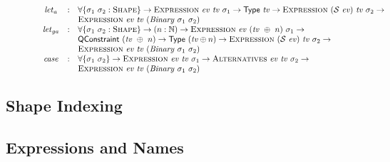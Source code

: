 \documentclass[a4paper]{jfp}
\begin{document}
\begin{figure}
\begin{displaymath}
\begin{array}{l}
\begin{array}{cll}
         \mathit{let}_a & : & \forall \{ \sigma_1\ \sigma_2 : \textsc{Shape} \} \rightarrow \textsc{Expression}\ \mathit{ev}\ \mathit{tv}\ \sigma_1
   \rightarrow \textsf{Type}\ \mathit{tv} \rightarrow \textsc{Expression}\ (\mathcal{S}\ \mathit{ev})\ \mathit{tv}\ \sigma_2 \rightarrow \\ &&\textsc{Expression}\ \mathit{ev}\ \mathit{tv}\
(\mathit{Binary}\ \sigma_1\ \sigma_2) \\
         \mathit{let}_{ga} & : & \forall \{ \sigma_1\ \sigma_2 : \textsc{Shape} \} \rightarrow (n : \mathbb{N}) \rightarrow \textsc{Expression}\
   \mathit{ev}\ (\mathit{tv}\ \oplus\ n)\ \sigma_1 \rightarrow \\ & & \textsf{QConstraint}\ (\mathit{tv}\ \oplus\ n)
   \rightarrow \textsf{Type}\ (\mathit{tv} \oplus n) \rightarrow \textsc{Expression}\ (\mathcal{S}\ \mathit{ev})\ \mathit{tv}\ \sigma_2 \rightarrow \\ &&\textsc{Expression}\ \mathit{ev}\ \mathit{tv}\
(\mathit{Binary}\ \sigma_1\ \sigma_2) \\
         \mathit{case} & : & \forall \{ \sigma_1\ \sigma_2 \} \rightarrow \textsc{Expression}\ \mathit{ev}\ \mathit{tv}\ \sigma_1 \rightarrow
   \textsc{Alternatives}\ \mathit{ev}\ \mathit{tv}\ \sigma_2 \rightarrow \\ & &  \textsc{Expression}\ \mathit{ev}\ \mathit{tv}\ (\mathit{Binary}\ \sigma_1\
\sigma_2) 
         \end{array}
      \end{array}
      
   \end{displaymath}
\end{figure}




\subsection{Shape Indexing}


\subsection{Expressions and Names}
\end{document}
